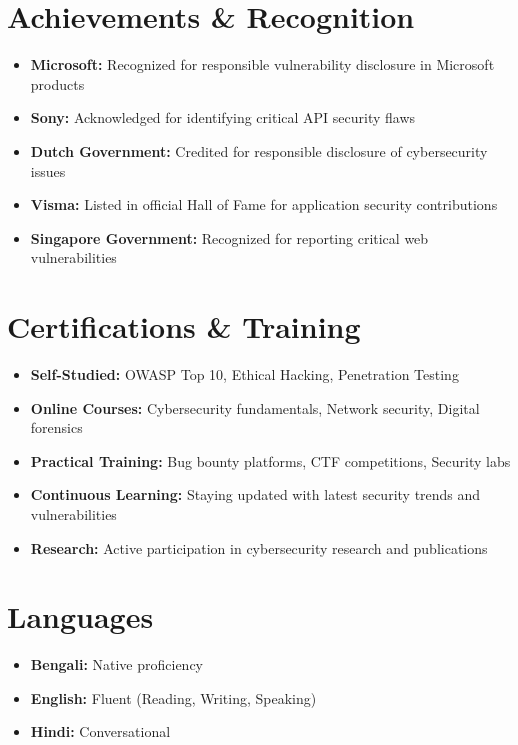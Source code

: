 \documentclass[11pt,a4paper]{article}
\begin{document}
\section{Achievements \& Recognition}
\begin{multicols}{2}
\begin{itemize}[leftmargin=0.15in, label={}]
\small{\item{
\begin{itemize}
\item \textbf{Microsoft:} Recognized for responsible vulnerability disclosure in Microsoft products
\item \textbf{Sony:} Acknowledged for identifying critical API security flaws
\item \textbf{Dutch Government:} Credited for responsible disclosure of cybersecurity issues
\item \textbf{Visma:} Listed in official Hall of Fame for application security contributions
\item \textbf{Singapore Government:} Recognized for reporting critical web vulnerabilities
\end{itemize}
}}
\end{itemize}
\end{multicols}

\section{Certifications \& Training}
\begin{itemize}[leftmargin=0.15in, label={}]
\small{\item{
\begin{itemize}
\item \textbf{Self-Studied:} OWASP Top 10, Ethical Hacking, Penetration Testing
\item \textbf{Online Courses:} Cybersecurity fundamentals, Network security, Digital forensics
\item \textbf{Practical Training:} Bug bounty platforms, CTF competitions, Security labs
\item \textbf{Continuous Learning:} Staying updated with latest security trends and vulnerabilities
\item \textbf{Research:} Active participation in cybersecurity research and publications
\end{itemize}
}}
\end{itemize}

\section{Languages}
\begin{itemize}[leftmargin=0.15in, label={}]
\small{\item{
\begin{itemize}
\item \textbf{Bengali:} Native proficiency
\item \textbf{English:} Fluent (Reading, Writing, Speaking)
\item \textbf{Hindi:} Conversational
\end{itemize}
}}
\end{itemize}
\end{document}
